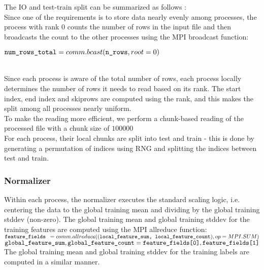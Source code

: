 \documentclass{article}
\begin{document}
The IO and test-train split can be summarized as follows : \\

Since one of the requirements is to store data nearly evenly among processes, the process with rank $0$ counts the number of rows in the input file and then broadcasts the count to the other processes using the MPI broadcast function:\\
    
\begin{code}
$\verb|num_rows_total| = comm.bcast(\verb|n_rows|, root=0)$       
\end{code} \\

Since each process is aware of the total number of rows, each process locally determines the number of rows it needs to read based on its rank. The start index, end index and skiprows are computed using the rank, and this makes the split among all processes nearly uniform. \\

To make the reading more efficient, we perform a chunk-based reading of the processed file with a chunk size of $100000$ \\
 
For each process, their local chunks are split into test and train - this is done by generating a permutation of indices using RNG and splitting the indices between test and train.

\subsubsection{Normalizer}
Within each process, the normalizer executes the standard scaling logic, i.e. centering the data to the global training mean and dividing by the global training stddev (non-zero).
The global training mean and global training stddev for the training features are computed using the MPI allreduce function:\\

$\verb|feature_fields |= comm.allreduce((\verb|local_feature_sum, local_feature_count|), op=MPI.SUM)$ \\
$\verb|global_feature_sum|, \verb|global_feature_count| = \verb|feature_fields[0]|, \verb|feature_fields[1]|$ \\

The global training mean and global training stddev for the training labels are computed in a similar manner. \\
\end{document}
